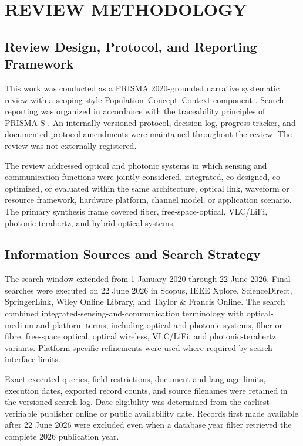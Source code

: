 \section{REVIEW METHODOLOGY}
\label{sec:review_methodology}

\subsection{Review Design, Protocol, and Reporting Framework}

This work was conducted as a PRISMA 2020-grounded narrative systematic review
with a scoping-style Population--Concept--Context component
\cite{PRISMA2020}. Search reporting was organized in accordance with the
traceability principles of PRISMA-S \cite{PRISMAS2021}. An internally versioned
protocol, decision log, progress tracker, and documented protocol amendments
were maintained throughout the review. The review was not externally
registered.

The review addressed optical and photonic systems in which sensing and
communication functions were jointly considered, integrated, co-designed,
co-optimized, or evaluated within the same architecture, optical link,
waveform or resource framework, hardware platform, channel model, or
application scenario. The primary synthesis frame covered fiber,
free-space-optical, VLC/LiFi, photonic-terahertz, and hybrid optical systems.

\subsection{Information Sources and Search Strategy}

The search window extended from 1 January 2020 through 22 June 2026. Final
searches were executed on 22 June 2026 in Scopus, IEEE Xplore,
ScienceDirect, SpringerLink, Wiley Online Library, and Taylor \& Francis
Online. The search combined integrated-sensing-and-communication terminology
with optical-medium and platform terms, including optical and photonic
systems, fiber or fibre, free-space optical, optical wireless, VLC/LiFi, and
photonic-terahertz variants. Platform-specific refinements were used where
required by search-interface limits.

Exact executed queries, field restrictions, document and language limits,
execution dates, exported record counts, and source filenames were retained in
the versioned search log. Date eligibility was determined from the earliest
verifiable publisher online or public availability date. Records first made
available after 22 June 2026 were excluded even when a database year filter
retrieved the complete 2026 publication year.

